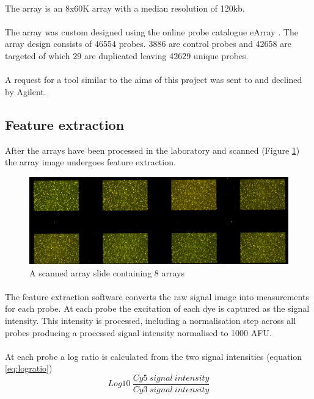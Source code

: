\paragraph*{}
The array is an 8x60K array with a median resolution of 120kb. 
\paragraph*{}
The array was custom designed using the online probe catalogue eArray \cite{agilenttechnologies_earray}. The array design consists of 46554 probes. 3886 are control probes and 42658 are targeted of which 29 are duplicated leaving 42629 unique probes.
\paragraph*{}
A request for a tool similar to the aims of this project was sent to and declined by Agilent.

\subsection{Feature extraction}
After the arrays have been processed in the laboratory and scanned (Figure \ref{fig:microarrayslide}) the array image undergoes feature extraction.
\begin{figure}
\centering
\includegraphics[width=\linewidth]{./Figures/microarrayslide}
\caption[A scanned 8 x 60k array]{A scanned array slide containing 8 arrays}
\label{fig:microarrayslide}
\end{figure}

\paragraph*{}
The feature extraction software converts the raw signal image into measurements for each probe. At each probe the excitation of each dye is captured as the signal intensity. This intensity is processed, including a normalisation step across all probes producing a processed signal intensity normalised to 1000 \ac{AFU}.
\paragraph*{}
At each probe a log ratio is calculated from the two signal intensities (equation \ref{eq:logratio})
\begin{equation}\label{eq:logratio}
Log10\ \frac{Cy5\ signal\ intensity}{Cy3\ signal\ intensity}
\end{equation} 

